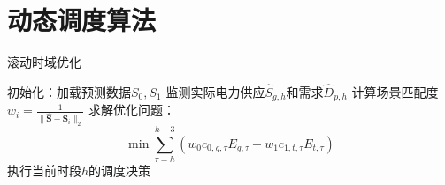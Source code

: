 \documentclass{article}
\begin{document}
\section{动态调度算法}
\begin{algorithm}[H]
\caption{滚动时域优化}
\begin{algorithmic}[1]
\STATE 初始化：加载预测数据$S_0,S_1$
\STATE 监测实际电力供应$\hat{S}_{g,h}$和需求$\hat{D}_{p,h}$
\STATE 计算场景匹配度 $w_i = \frac{1}{\|\hat{\mathbf{S}} - \mathbf{S}_i\|_2}$
\STATE 求解优化问题：
$$
\min \sum_{\tau=h}^{h+3} \left( w_0 c_{0,g,\tau}E_{g,\tau} + w_1 c_{1,t,\tau}E_{t,\tau} \right)
$$
\STATE 执行当前时段$h$的调度决策
\ENDFOR
\end{algorithmic}
\end{algorithm}
\end{document}
